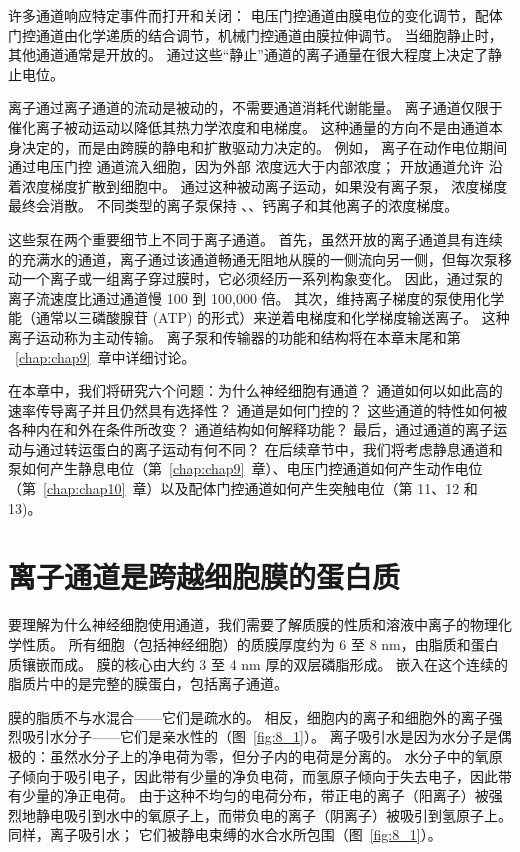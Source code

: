 许多通道响应特定事件而打开和关闭：
电压门控通道由膜电位的变化调节，配体门控通道由化学递质的结合调节，机械门控通道由膜拉伸调节。
当细胞静止时，其他通道通常是开放的。
通过这些“静止”通道的离子通量在很大程度上决定了静止电位。


离子通过离子通道的流动是被动的，不需要通道消耗代谢能量。
离子通道仅限于催化离子被动运动以降低其热力学浓度和电梯度。
这种通量的方向不是由通道本身决定的，而是由跨膜的静电和扩散驱动力决定的。
例如， 离子在动作电位期间通过电压门控  通道流入细胞，因为外部  浓度远大于内部浓度；
开放通道允许  沿着浓度梯度扩散到细胞中。
通过这种被动离子运动，如果没有离子泵， 浓度梯度最终会消散。
不同类型的离子泵保持 、、钙离子和其他离子的浓度梯度。


这些泵在两个重要细节上不同于离子通道。
首先，虽然开放的离子通道具有连续的充满水的通道，离子通过该通道畅通无阻地从膜的一侧流向另一侧，但每次泵移动一个离子或一组离子穿过膜时，它必须经历一系列构象变化。
因此，通过泵的离子流速度比通过通道慢 100 到 100,000 倍。
其次，维持离子梯度的泵使用化学能（通常以三磷酸腺苷 (ATP) 的形式）来逆着电梯度和化学梯度输送离子。
这种离子运动称为主动传输。
离子泵和传输器的功能和结构将在本章末尾和第 ~\ref{chap:chap9}~章中详细讨论。


在本章中，我们将研究六个问题：为什么神经细胞有通道？
通道如何以如此高的速率传导离子并且仍然具有选择性？ 
通道是如何门控的？
这些通道的特性如何被各种内在和外在条件所改变？
通道结构如何解释功能？
最后，通过通道的离子运动与通过转运蛋白的离子运动有何不同？
在后续章节中，我们将考虑静息通道和泵如何产生静息电位（第~\ref{chap:chap9}~章）、电压门控通道如何产生动作电位（第~\ref{chap:chap10}~章）以及配体门控通道如何产生突触电位（第 11、12 和 13)。



\section{离子通道是跨越细胞膜的蛋白质}

要理解为什么神经细胞使用通道，我们需要了解质膜的性质和溶液中离子的物理化学性质。
所有细胞（包括神经细胞）的质膜厚度约为 6 至 8 nm，由脂质和蛋白质镶嵌而成。
膜的核心由大约 3 至 4 nm 厚的双层磷脂形成。
嵌入在这个连续的脂质片中的是完整的膜蛋白，包括离子通道。


膜的脂质不与水混合——它们是疏水的。
相反，细胞内的离子和细胞外的离子强烈吸引水分子——它们是亲水性的（图~\ref{fig:8_1}）。
离子吸引水是因为水分子是偶极的：虽然水分子上的净电荷为零，但分子内的电荷是分离的。
水分子中的氧原子倾向于吸引电子，因此带有少量的净负电荷，而氢原子倾向于失去电子，因此带有少量的净正电荷。
由于这种不均匀的电荷分布，带正电的离子（阳离子）被强烈地静电吸引到水中的氧原子上，而带负电的离子（阴离子）被吸引到氢原子上。
同样，离子吸引水； 它们被静电束缚的水合水所包围（图~\ref{fig:8_1}）。



